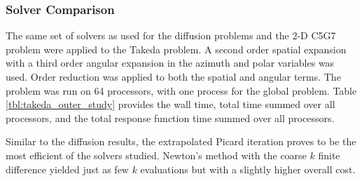 \subsubsection{Solver Comparison}

The same set of solvers as used for the diffusion problems 
and the 2-D C5G7 problem were applied to the Takeda problem. A second 
order spatial expansion with a third order angular expansion in the 
azimuth and polar variables was used.  Order reduction was applied to both 
the spatial and angular terms.  The problem was run on 64 processors, with 
one process for the global problem.  Table \ref{tbl:takeda_outer_study} 
provides the wall time, total time summed over all processors, and the 
total response function time summed over all processors.  

Similar to the diffusion results, the extrapolated Picard iteration 
proves to be the most efficient of the solvers studied.  
Newton's method with the coarse $k$ finite difference yielded just as 
few $k$ evaluations but with a slightly higher overall cost.

